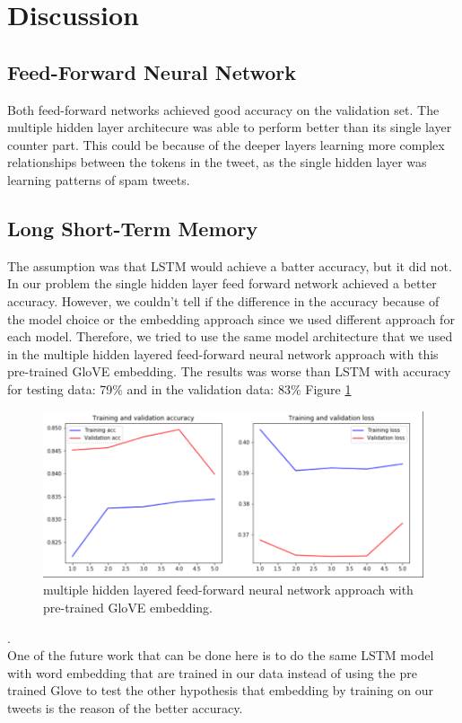 \section{Discussion}
\label{sec:discussion}


\subsection{Feed-Forward Neural Network} Both feed-forward networks
achieved good accuracy on the validation set. The multiple hidden
layer architecure was able to perform better than its single layer
counter part. This could be because of the deeper layers learning more
complex relationships between the tokens in the tweet, as the single
hidden layer was learning patterns of spam tweets.

\subsection{Long Short-Term Memory }
The assumption was that LSTM would achieve a batter accuracy, but it did not. In our problem the single hidden layer feed forward network achieved a better accuracy. However, we couldn’t tell if the difference in the accuracy because of the model choice or the embedding approach since we used different approach for each model. Therefore, we tried to use the same model architecture that we used in the multiple hidden layered feed-forward neural network approach with this pre-trained GloVE embedding. The results was worse than LSTM with accuracy for testing data: 79\% and in the validation data: 83\% Figure \ref{fig:nnpre}
 \begin{figure}[h!]
  \includegraphics{nnPretrain.png}
  \caption{multiple hidden layered feed-forward neural network approach with pre-trained GloVE embedding.}
  \label{fig:nnpre}
\end{figure} . 
\\ One of the future work that can be done here is to do the same LSTM model with word embedding that are trained in our data instead of using the pre trained Glove to test the other hypothesis that embedding by training on our tweets is the reason of the better accuracy. 
